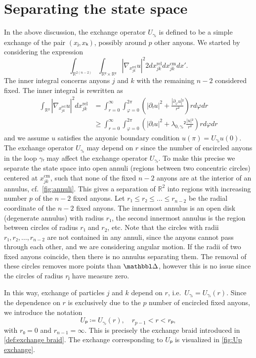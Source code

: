 \section{Separating the state space}

In the above discussion, the exchange operator $U_{γᵣ}$ is defined to be a simple exchange of the pair $(xⱼ,xₖ)$, possibly around $p$ other anyons. We started by considering the expression
\begin{equation}
  ∫_{ℝ^{2(n-2)}} ∫_{ℝ² \times ℝ²} \left|∇_{x_{jk}^\text{rel}}u\right|^2  2 dx_{jk}^\text{rel}dx_{jk}^\text{cm} dx'.
\end{equation}
The inner integral concerns anyons $j$ and $k$ with the remaining $n-2$ considered fixed. The inner integral is rewritten as
\begin{equation}
  \begin{aligned}
    ∫_{ℝ²} \left|∇_{x_{jk}^\text{rel}} u \right|^2 dx_{jk}^\text{rel}
    &= ∫_{r=0}^∞ ∫_{φ=0}^{2π} \left( \left|∂ᵣu\right|^2 + \frac{\left|∂_φu\right|²}{r²} \right) r dφ dr \\
    &≥ ∫_{r=0}^∞ ∫_{φ=0}^{2π} \left( \left|∂ᵣu\right|^2 + λ_{0,γᵣ}²\frac{\left|u\right|²}{r²} \right) r dφ dr
  \end{aligned}
\end{equation}
and we assume $u$ satisfies the anyonic boundary condition $u(π) = U_{γᵣ} u(0)$. The exchange operator $U_{γᵣ}$ may depend on $r$ since the number of encircled anyons in the loop $γᵣ$ may affect the exchange operator $U_{γᵣ}$. To make this precise we separate the state space into open annuli (regions between two concentric circles) centered at $x_{jk}^\text{cm}$, such that none of the fixed $n-2$ anyons are at the interior of an annulus, cf.\ \cref{fig:annuli}. This gives a separation of $ℝ^2$ into regions with increasing number $p$ of the $n-2$ fixed anyons. Let $r₁ \le r₂ \le … \le r_{n-2}$ be the radial coordinate of the $n-2$ fixed anyons. The innermost annulus is an open disk (degenerate annulus) with radius $r₁$, the second innermost annulus is the region between circles of radius $r₁$ and $r_2$, etc. Note that the circles with radii $r₁, r₂, …, r_{n-2}$ are not contained in any annuli, since the anyons cannot pass through each other, and we are considering angular motion. If the radii of two fixed anyons coincide, then there is no annulus separating them. The removal of these circles removes more points than $\bbDelta$, however this is no issue since the circles of radius $rⱼ$ have measure zero.

In this way, exchange of particles $j$ and $k$ depend on $r$, i.e.\ $U_{γᵣ} = U_{γᵣ}(r)$. Since the dependence on $r$ is exclusively due to the $p$ number of encircled fixed anyons, we introduce the notation
\begin{equation}
  Uₚ ≔ U_{γᵣ}(r), \quad r_{p-1} < r < rₚ,
\end{equation}
with $r₀ = 0$ and $r_{n-1} = ∞$. This is precisely the exchange braid introduced in \cref{def:exchange braid}. The exchange corresponding to $Uₚ$ is visualized in \cref{fig:Up exchange}.

